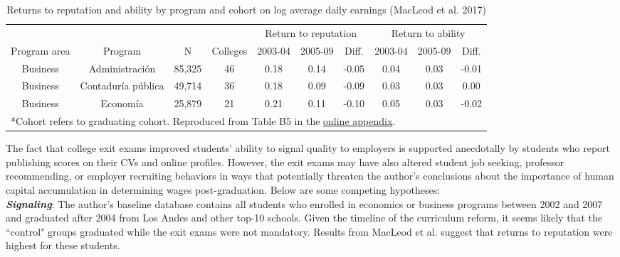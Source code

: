\documentclass[a4paper, 11pt]{article}
\begin{document}
\begin{table}[h!]
 \begin{adjustwidth}{-.75in}{-.75in} 
 \begin{center}
 \caption{Returns to reputation and ability by program and cohort on log average daily earnings (MacLeod et al. 2017)}
 \vspace{8pt}
\begin{tabular}{cccccccccc}
\toprule
             &                    &        &          & \multicolumn{3}{c}{Return to reputation}&\multicolumn{3}{c}{Return to ability}       \\
             \cmidrule(lr){5-7} \cmidrule(lr){8-10}
Program area & Program            & N      & Colleges & 2003-04              & 2005-09 & Diff. & 2003-04           & 2005-09 & Diff. \\
\midrule
Business     & Administraci\'on     & 85,325 & 46       & 0.18                 & 0.14    & -0.05 & 0.04              & 0.03    & -0.01 \\
Business     & Contadur\'ia p\'ublica & 49,714 & 36       & 0.18                 & 0.09    & -0.09 & 0.03              & 0.03    & 0.00  \\
Business     & Econom\'ia           & 25,879 & 21       & 0.21                 & 0.11    & -0.10 & 0.05              & 0.03    & -0.02 \\
\bottomrule
\multicolumn{8}{l}{\small{*Cohort refers to graduating cohort. Reproduced from Table B5 in the \href{https://assets.aeaweb.org/assets/production/files/4738.pdf}{online appendix}.}}
\end{tabular}
\label{tab:macleod}
\end{center}
\end{adjustwidth}
\end{table}

The fact that college exit exams improved students' ability to signal quality to employers is supported anecdotally by students who report publishing scores on their CVs and online profiles.  However, the exit exams may have also altered student job seeking, professor recommending, or employer recruiting behaviors in ways that potentially threaten the author's conclusions about the importance of human capital accumulation in determining wages post-graduation.  Below are some competing hypotheses:
\\

\noindent \textbf{\textit{Signaling}}:  The author's baseline database contains all students who enrolled in economics or business programs between 2002 and 2007 and graduated after 2004 from Los Andes and other top-10 schools.  Given the timeline of the curriculum reform, it seems likely that the ``control" groups graduated while the exit exams were not mandatory.  Results from MacLeod et al. suggest that returns to reputation were highest for these students.  
\end{document}
